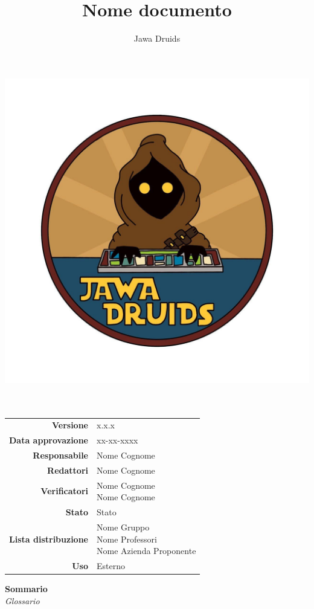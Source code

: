 




\makeatletter
\begin{titlepage}
	\begin{center}
		\vspace*{-5cm}
		\author{Jawa Druids}
		\title{Nome documento}
		\date{} %
		\includegraphics[width=0.7\linewidth]{../immagini/DRUIDSLOGO.jpg}\\[4ex]
		{\huge \bfseries  \@title }\\[2ex]
		{\LARGE  \@author}\\[50ex]
		\vspace*{-9cm}
		\begin{table}[H]
			\renewcommand{\arraystretch}{1.4}
			\centering
			\begin{tabular}{r | l}
				\textbf{Versione} & x.x.x \\%
				\textbf{Data approvazione} & xx-xx-xxxx\\
				\textbf{Responsabile} & Nome Cognome\\
				\textbf{Redattori} & Nome Cognome \\
				\textbf{Verificatori} & \makecell[tl]{Nome Cognome \\ Nome Cognome} \\
				\textbf{Stato} & Stato\\
				\textbf{Lista distribuzione} & \makecell[tl]{Nome Gruppo \\ Nome Professori \\ Nome Azienda Proponente}\\
				\textbf{Uso} & Esterno
			\end{tabular}
		\end{table}
		\vspace{0.1cm}
		\hfill \break
		\fontsize{17}{10}\textbf{Sommario} \\
		\vspace{0.1cm}
		\textit{Glossario}
	\end{center}
\end{titlepage}
\makeatother

